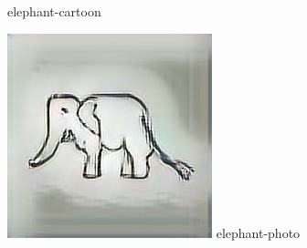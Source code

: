 \documentclass{article}
\begin{document}
\begin{figure}[htp]
\begin{minipage}{0.14285714285714285\linewidth}
        {elephant-cartoon}
    \end{minipage}%
    \begin{minipage}{0.14285714285714285\linewidth}
        \includegraphics[width=\linewidth]{./classify/derived-files/elephant_photo_0.jpg}
        {elephant-photo}
    \end{minipage}%


\end{figure}
\end{document}
